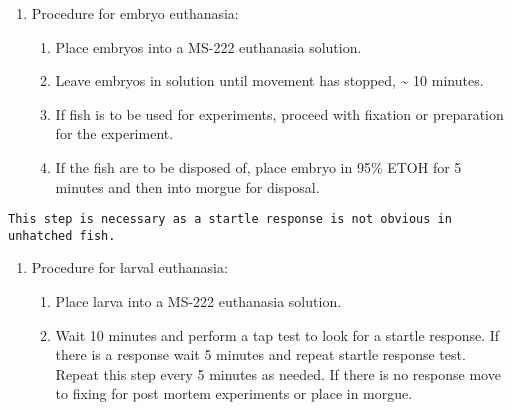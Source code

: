 \documentclass[
  letterpaper,
  DIV=11,
  numbers=noendperiod]{scrreprt}
\providecommand{\tightlist}{%
  \setlength{\itemsep}{0pt}\setlength{\parskip}{0pt}}\usepackage{longtable,booktabs,array}
\begin{document}
\begin{enumerate}
\def\labelenumi{\arabic{enumi}.}
\item
  Procedure for embryo euthanasia:

  \begin{enumerate}
  \def\labelenumii{\arabic{enumii}.}
  \tightlist
  \item
    Place embryos into a MS-222 euthanasia solution.
  \item
    Leave embryos in solution until movement has stopped,
    \textasciitilde{} 10 minutes.
  \item
    If fish is to be used for experiments, proceed with fixation or
    preparation for the experiment.
  \item
    If the fish are to be disposed of, place embryo in 95\% ETOH for 5
    minutes and then into morgue for disposal.
  \end{enumerate}
\end{enumerate}

\begin{tcolorbox}[enhanced jigsaw, bottomtitle=1mm, rightrule=.15mm, toptitle=1mm, opacitybacktitle=0.6, bottomrule=.15mm, titlerule=0mm, coltitle=black, leftrule=.75mm, arc=.35mm, colback=white, colframe=quarto-callout-warning-color-frame, left=2mm, colbacktitle=quarto-callout-warning-color!10!white, title=\textcolor{quarto-callout-warning-color}{\faExclamationTriangle}\hspace{0.5em}{NOTES}, toprule=.15mm, opacityback=0, breakable]

\begin{verbatim}
This step is necessary as a startle response is not obvious in unhatched fish.
\end{verbatim}

\end{tcolorbox}

\begin{enumerate}
\def\labelenumi{\arabic{enumi}.}
\setcounter{enumi}{1}
\item
  Procedure for larval euthanasia:

  \begin{enumerate}
  \def\labelenumii{\arabic{enumii}.}
  \tightlist
  \item
    Place larva into a MS-222 euthanasia solution.
  \item
    Wait 10 minutes and perform a tap test to look for a startle
    response. If there is a response wait 5 minutes and repeat startle
    response test. Repeat this step every 5 minutes as needed. If there
    is no response move to fixing for post mortem experiments or place
    in morgue.
  \end{enumerate}
\end{enumerate}
\end{document}
